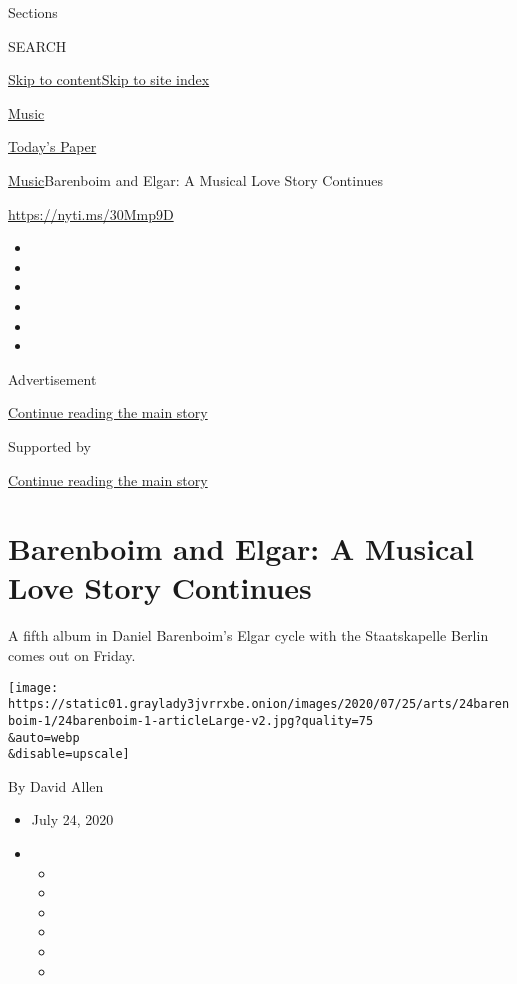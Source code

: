 Sections

SEARCH

\protect\hyperlink{site-content}{Skip to
content}\protect\hyperlink{site-index}{Skip to site index}

\href{https://www.nytimes3xbfgragh.onion/section/arts/music}{Music}

\href{https://myaccount.nytimes3xbfgragh.onion/auth/login?response_type=cookie\&client_id=vi}{}

\href{https://www.nytimes3xbfgragh.onion/section/todayspaper}{Today's
Paper}

\href{/section/arts/music}{Music}\textbar{}Barenboim and Elgar: A
Musical Love Story Continues

\url{https://nyti.ms/30Mmp9D}

\begin{itemize}
\item
\item
\item
\item
\item
\item
\end{itemize}

Advertisement

\protect\hyperlink{after-top}{Continue reading the main story}

Supported by

\protect\hyperlink{after-sponsor}{Continue reading the main story}

\hypertarget{barenboim-and-elgar-a-musical-love-story-continues}{%
\section{Barenboim and Elgar: A Musical Love Story
Continues}\label{barenboim-and-elgar-a-musical-love-story-continues}}

A fifth album in Daniel Barenboim's Elgar cycle with the Staatskapelle
Berlin comes out on Friday.

\texttt{[image: https://static01.graylady3jvrrxbe.onion/images/2020/07/25/arts/24barenboim-1/24barenboim-1-articleLarge-v2.jpg?quality=75\\\&auto=webp\\\&disable=upscale]}

By David Allen

\begin{itemize}
\item
  July 24, 2020
\item
  \begin{itemize}
  \item
  \item
  \item
  \item
  \item
  \item
  \end{itemize}
\end{itemize}

